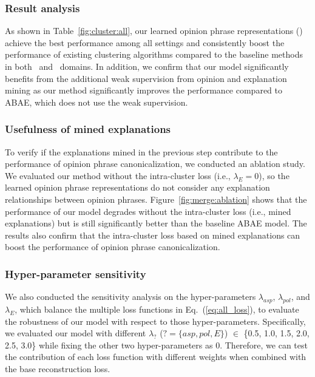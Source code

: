 \subsubsection{Result analysis}
As shown in Table~\ref{fig:cluster:all}, 
our learned opinion phrase representations (\canonical) achieve the best performance among all settings and consistently boost the performance of existing clustering algorithms compared to the baseline methods in both \hotel\ and \restaurant\ domains. In addition, we confirm that our model significantly benefits from the additional weak supervision from opinion and explanation mining as our method significantly improves the performance compared to ABAE, which does not use the weak supervision.


\subsubsection{Usefulness of mined explanations}\label{subsubsec:usefulness}
To verify if the explanations mined in the previous step contribute to the performance of opinion phrase canonicalization, we conducted an ablation study. We evaluated our method without the intra-cluster loss (i.e., $\lambda_E = 0$), so the learned opinion phrase representations do not consider any explanation relationships between opinion phrases.
Figure~\ref{fig:merge:ablation} shows that the performance of our model degrades without the intra-cluster loss (i.e., mined explanations) but is still significantly better than the baseline ABAE model. The results also confirm that the intra-cluster loss based on mined explanations can boost the performance of opinion phrase canonicalization.



\subsubsection{Hyper-parameter sensitivity} \label{sec:cluster:sensitivity}


We also conducted the sensitivity analysis on the hyper-parameters $\lambda_{asp}$, $\lambda_{pol}$, and $\lambda_E$, which balance the multiple loss functions in Eq.~(\ref{eq:all_loss}), to evaluate the robustness of our model with respect to those hyper-parameters. Specifically, we evaluated our model with different $\lambda_?$ ($? = \{asp, pol, E\}$) $\in$ \{0.5, 1.0, 1.5, 2.0, 2.5, 3.0\} while fixing the other two hyper-parameters as 0. Therefore, we can test the contribution of each loss function with different weights when combined with the base reconstruction loss.

